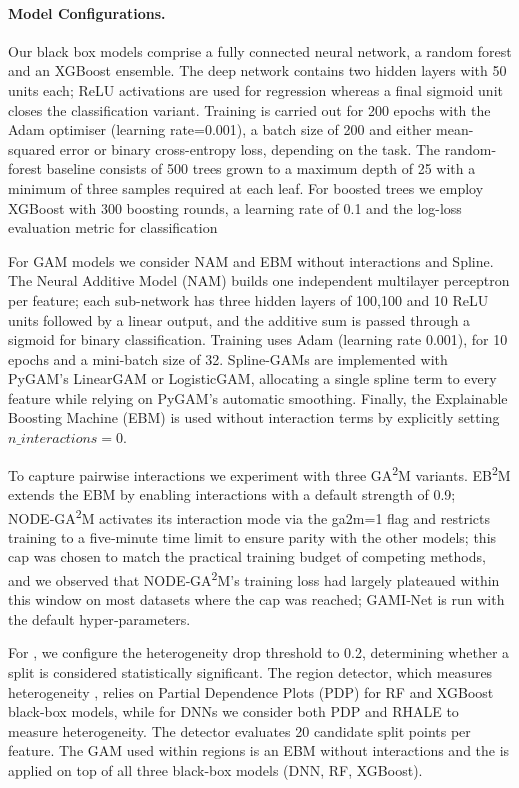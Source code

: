 \paragraph{Model Configurations.}

Our black box models comprise a fully connected neural network, a random forest and an XGBoost ensemble. The deep network contains two hidden layers with 50 units each; ReLU activations are used for regression whereas a final sigmoid unit closes the classification variant. Training is carried out for 200 epochs with the Adam optimiser (learning rate=0.001), a batch size of 200 and either mean-squared error or binary cross-entropy loss, depending on the task. The random-forest baseline consists of 500 trees grown to a maximum depth of 25 with a minimum of three samples required at each leaf. For boosted trees we employ XGBoost with 300 boosting rounds, a learning rate of 0.1 and the log-loss evaluation metric for classification

For GAM models we consider NAM and EBM without interactions and Spline. The Neural Additive Model (NAM) builds one independent multilayer perceptron per feature; each sub-network has three hidden layers of 100,100 and 10 ReLU units followed by a linear output, and the additive sum is passed through a sigmoid for binary classification. Training uses Adam (learning rate 0.001), for 10 epochs and a mini-batch size of 32. Spline-GAMs are implemented with PyGAM’s LinearGAM or LogisticGAM, allocating a single spline term to every feature while relying on PyGAM’s automatic smoothing. Finally, the Explainable Boosting Machine (EBM) is used without interaction terms by explicitly setting $n\_interactions=0$.

To capture pairwise interactions we experiment with three GA\textsuperscript{2}M variants. EB\textsuperscript{2}M extends the EBM by enabling interactions with a default strength of 0.9; NODE‑GA\textsuperscript{2}M activates its interaction mode via the ga2m=1 flag and restricts training to a five‑minute time limit to ensure parity with the other models; this cap was chosen to match the practical training budget of competing methods, and we observed that NODE‑GA\textsuperscript{2}M's training loss had largely plateaued within this window on most datasets where the cap was reached; GAMI‑Net is run with the default hyper‑parameters.

For \method{} , we configure the heterogeneity drop threshold to 0.2, determining whether a split is considered statistically significant. The region detector, which measures heterogeneity , relies on Partial Dependence Plots (PDP) for RF and XGBoost black-box models, while for DNNs we consider both PDP and RHALE to measure heterogeneity. The detector evaluates 20 candidate split points per feature. The GAM used within regions is an EBM without interactions and the \method{} is applied on top of all three black-box models (DNN, RF, XGBoost).

